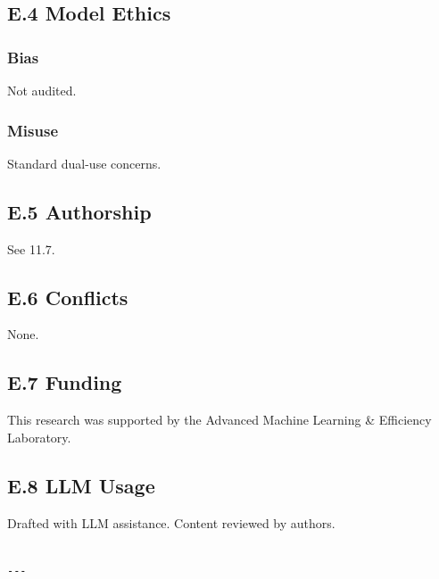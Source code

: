 \subsection{E.4 Model Ethics}

\subsubsection{Bias}
Not audited.

\subsubsection{Misuse}
Standard dual-use concerns.

\subsection{E.5 Authorship}

See  11.7.

\subsection{E.6 Conflicts}

None.

\subsection{E.7 Funding}

This research was supported by the Advanced Machine Learning \& Efficiency Laboratory.

\subsection{E.8 LLM Usage}

Drafted with LLM assistance. Content reviewed by authors.
\begin{lstlisting}

---
\end{lstlisting}